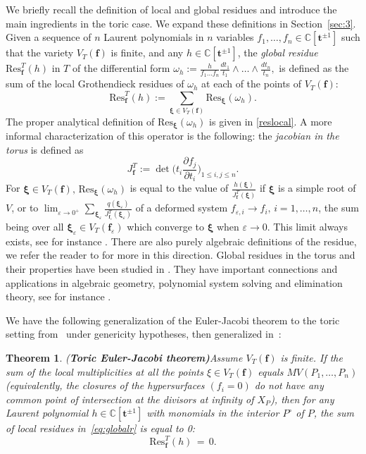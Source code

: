\documentclass[a4paper,11pt]{amsart}
\newcommand{\C}{\mathbb{C}}
\newcommand{\bff}{{\boldsymbol{f}}}
\newcommand{\bft}{{\boldsymbol{t}}}
\newcommand{\bfxi}{{\boldsymbol{\xi}}}
\newcounter{thm}
\numberwithin{thm}{section}
\numberwithin{equation}{section}
\theoremstyle{definition}
\theoremstyle{plain}
\newtheorem{theorem}[thm]{Theorem}
\begin{document}
We briefly recall the definition of local and global residues and introduce the main ingredients in the toric case. We expand these definitions in Section~\ref{sec:3}.
Given a sequence of $n$ Laurent polynomials in $n$ variables $f_1,\ldots, f_n\in \C[\bft^{\pm1}]$ 
such that the variety $V_T(\bff)$ is finite,  and any  $h\in \C[\bft^{\pm1}]$, the \emph{global residue} $\mbox{Res}^T_\bff(h)$ in $T$  of the differential form
$\omega_h:=\frac{h}{f_1\ldots f_n}\frac{dt_1}{t_1}\wedge\ldots\wedge\frac{dt_n}{t_n},
$
is defined as the sum of the local Grothendieck residues of $\omega_h$ at each of the points of $V_T(\bff):$
\begin{equation}\label{eq:globalr}
\mbox{Res}^T_\bff(h):=\sum_{\bfxi\in V_T(\bff)}\mbox{Res}_{\bfxi}(\omega_h).
\end{equation}
The proper analytical definition of $\mbox{Res}_{\bfxi}(\omega_h)$ is given in \eqref{reslocal}. 
A more informal characterization of this operator is the following:
the \emph{jacobian in the torus} is defined as 
\begin{equation}\label{afj}
J^T_\bff:=\det\big(t_i\frac{\partial f_j}{\partial t_i}\big)_{1\leq i, j\leq n}.
\end{equation}
For $\bfxi\in V_T(\bff),\, \mbox{Res}_{\bfxi}(\omega_h)$  is equal to the value of $\frac{h(\bfxi)}{J^T_\bff(\bfxi)}$ if $\bfxi$ is a simple root of $V$, or to $\lim_{\varepsilon\to 0^+}\sum_{\bfxi_\varepsilon} \frac{q(\bfxi_\varepsilon)}{J^T_{\bff_\varepsilon} (\bfxi_\varepsilon)}$ of a deformed system $f_{\varepsilon,i}\to f_i,\,i=1,\ldots, n$, the sum being over all $\bfxi_\varepsilon\in V_T(\bff_\varepsilon)$ which converge to $\bfxi$ when $\varepsilon\to0.$ This limit always exists, see for instance \cite[\S 5.11]{AGV85}. There are also purely algebraic definitions of the residue, we refer the reader to \cite{kun08,BCRS96} for more in this direction.
Global residues in the torus and their properties have been studied in \cite{kho78b, sop07, CD97, CDS98}. They have important connections and applications in algebraic geometry,  polynomial system solving and elimination theory, see for instance \cite{CM96, EM00, EM04, CD05a, sop13, SZ16, BSST23, BCCFMM24, SY24, vill24}. 
 
We have the following generalization of the {Euler-Jacobi theorem} to the {toric} setting from~\cite[Theorem 2]{kho78} under
genericity hypotheses, then generalized in~\cite[Corollary $5$]{CD97}: 

\smallskip

\begin{theorem} {{\rm (}\bf Toric Euler-Jacobi theorem{\rm )}}\label{koo} 
Assume $V_T(\bff)$ is finite. If the sum of the local multiplicities
 at all the points $\xi \in V_T(\bff)$ equals $ MV(P_1, \dots, P_n)$ (equivalently, the closures of the 
 hypersurfaces $(f_i=0)$ do not have any common point of intersection at the divisors at infinity of $X_P$), then for any
Laurent polynomial $h \in \C[\bft^{\pm1}]$ with monomials in the interior $P^\circ$ of $P$, the sum of local residues
in~\eqref{eq:globalr} 
is equal to 0:
\[\mbox{Res}^T_\bff(h) \, = \, 0.\]
\end{theorem}
\end{document}
